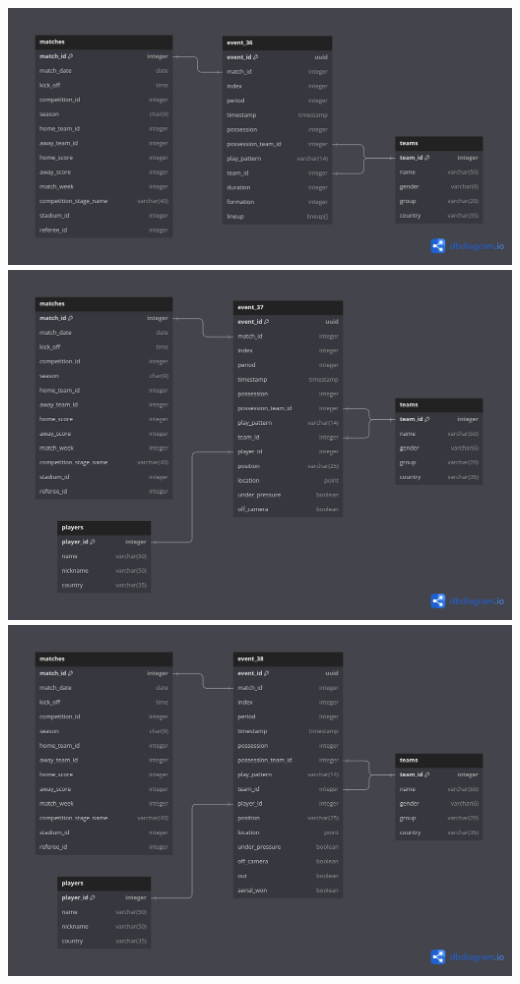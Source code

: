 \documentclass[12pt]{article}
\begin{document}
\includegraphics[width=\textwidth]{schema-diagram/event_36.png}
\includegraphics[width=\textwidth]{schema-diagram/event_37.png}
\includegraphics[width=\textwidth]{schema-diagram/event_38.png}
\end{document}

